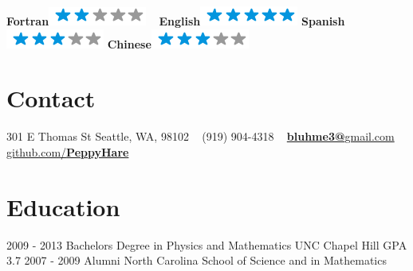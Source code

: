 \documentclass[]{fancy-resume}
\begin{document}
\begin{aside}
    \textbf{Fortran}\includegraphics[scale=0.40]{img/2stars.png}
    ~
    \textbf{English}\includegraphics[scale=0.40]{img/5stars.png}
    \textbf{Spanish}\includegraphics[scale=0.40]{img/3stars.png}
    \textbf{Chinese}\includegraphics[scale=0.40]{img/3stars.png}
  \section{Contact}
    301 E Thomas St
    Seattle, WA, 98102
    ~
    (919) 904-4318
    ~
    \href{mailto:bluhme3@gmail.com}{\textbf{bluhme3@}gmail.com}
    ~
    \href{https://github.com/peppyhare}{github.com/\textbf{PeppyHare}}
    ~
\end{aside}

\section{Education}
\begin{entrylist}
  \entry
    {2009 - 2013}
    {Bachelors Degree in Physics and Mathematics}
    {UNC Chapel Hill}
    {GPA 3.7}
  \entryoneline
    {2007 - 2009}
    {Alumni}
    {North Carolina School of Science and in Mathematics}
\end{entrylist}
\end{document}
